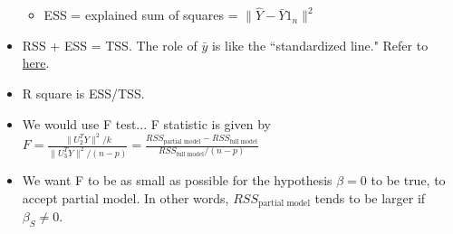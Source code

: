 \documentclass[11pt,reqno]{amsart}
\theoremstyle{remark}
\begin{document}
\begin{itemize}
\begin{itemize}
\item ESS = explained sum of squares = $\lVert \hat Y - \bar Y 1_n\rVert^2$
\end{itemize}
\item RSS + ESS = TSS. The role of $\bar y$ is like the ``standardized line." Refer to \href{https://stats.stackexchange.com/questions/234850/intuition-behind-regression-sum-of-squares}{here}.
\item R square is ESS/TSS.
\item We would use F test... F statistic is given by $F=\frac{\lVert U_2^T Y\rVert^2/k}{\lVert U_3^T Y\rVert^2/(n-p)}=\frac{RSS_\text{partial model}-RSS_\text{full model}}{RSS_\text{full model}/(n-p)}$
\item We want F to be as small as possible for the hypothesis $\beta=0$ to be true, to accept partial model. In other words, $RSS_\text{partial model}$ tends to be larger if $\beta_S\neq 0$.
\end{itemize}
\maketitle
\begin{sloppypar}

\end{sloppypar}
\end{document}
